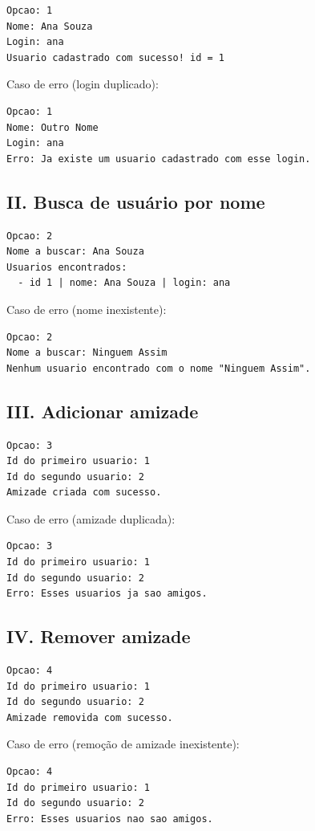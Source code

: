\documentclass[
	12pt,				%
	oneside,			%
	a4paper,			%
	chapter=TITLE,		%
	brazil,				%
	]{abntex2}
\begin{document}
\begin{lstlisting}
Opcao: 1
Nome: Ana Souza
Login: ana
Usuario cadastrado com sucesso! id = 1
\end{lstlisting}

Caso de erro (login duplicado):
\begin{lstlisting}
Opcao: 1
Nome: Outro Nome
Login: ana
Erro: Ja existe um usuario cadastrado com esse login.
\end{lstlisting}

\subsection{II. Busca de usuário por nome}

\begin{lstlisting}
Opcao: 2
Nome a buscar: Ana Souza
Usuarios encontrados:
  - id 1 | nome: Ana Souza | login: ana
\end{lstlisting}

Caso de erro (nome inexistente):
\begin{lstlisting}
Opcao: 2
Nome a buscar: Ninguem Assim
Nenhum usuario encontrado com o nome "Ninguem Assim".
\end{lstlisting}

\subsection{III. Adicionar amizade}

\begin{lstlisting}
Opcao: 3
Id do primeiro usuario: 1
Id do segundo usuario: 2
Amizade criada com sucesso.
\end{lstlisting}

Caso de erro (amizade duplicada):
\begin{lstlisting}
Opcao: 3
Id do primeiro usuario: 1
Id do segundo usuario: 2
Erro: Esses usuarios ja sao amigos.
\end{lstlisting}

\subsection{IV. Remover amizade}

\begin{lstlisting}
Opcao: 4
Id do primeiro usuario: 1
Id do segundo usuario: 2
Amizade removida com sucesso.
\end{lstlisting}

Caso de erro (remoção de amizade inexistente):
\begin{lstlisting}
Opcao: 4
Id do primeiro usuario: 1
Id do segundo usuario: 2
Erro: Esses usuarios nao sao amigos.
\end{lstlisting}
\end{document}
